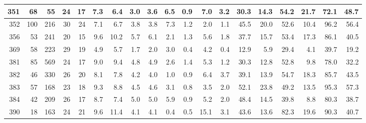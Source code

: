 \documentclass[
  12pt]{article}
\theoremstyle{definition}
\theoremstyle{remark}
\begin{document}
\begin{table}
{\begin{tabular}[t]{r|r|r|r|r|r|r|r|r|r|r|r|r|r|r|r|r|r|r}
\hline
351 & 68 & 55 & 24 & 17 & 7.3 & 6.4 & 3.0 & 3.6 & 6.5 & 0.9 & 7.0 & 3.2 & 30.3 & 14.3 & 54.2 & 21.7 & 72.1 & 48.7\\
\hline
352 & 100 & 216 & 30 & 24 & 7.1 & 6.7 & 3.8 & 3.8 & 7.3 & 1.2 & 2.0 & 1.1 & 45.5 & 20.0 & 52.6 & 10.4 & 96.2 & 56.4\\
\hline
356 & 53 & 241 & 20 & 15 & 9.6 & 10.2 & 5.7 & 6.1 & 2.1 & 1.3 & 5.6 & 1.8 & 37.7 & 15.7 & 53.4 & 17.3 & 86.1 & 40.5\\
\hline
369 & 58 & 223 & 29 & 19 & 4.9 & 5.7 & 1.7 & 2.0 & 3.0 & 0.4 & 4.2 & 0.4 & 12.9 & 5.9 & 29.4 & 4.1 & 39.7 & 19.2\\
\hline
381 & 85 & 569 & 24 & 17 & 9.0 & 9.4 & 4.8 & 4.9 & 2.6 & 1.4 & 5.3 & 1.2 & 30.3 & 12.8 & 52.8 & 9.8 & 78.0 & 32.2\\
\hline
382 & 46 & 330 & 26 & 20 & 8.1 & 7.8 & 4.2 & 4.0 & 1.0 & 0.9 & 6.4 & 3.7 & 39.1 & 13.9 & 54.7 & 18.3 & 85.7 & 43.5\\
\hline
383 & 57 & 168 & 23 & 18 & 9.3 & 8.8 & 4.5 & 4.6 & 3.1 & 0.8 & 3.5 & 2.0 & 52.1 & 23.8 & 49.2 & 13.5 & 95.3 & 57.3\\
\hline
384 & 42 & 209 & 26 & 17 & 8.7 & 7.4 & 5.0 & 5.0 & 5.9 & 0.9 & 5.2 & 2.0 & 48.4 & 14.5 & 39.8 & 8.8 & 80.3 & 38.7\\
\hline
390 & 18 & 163 & 24 & 21 & 9.6 & 11.4 & 4.1 & 4.1 & 0.4 & 0.5 & 15.1 & 3.1 & 43.6 & 13.6 & 82.3 & 19.6 & 90.3 & 40.7\\
\hline
\end{tabular}

}

\end{table}%
\end{document}
